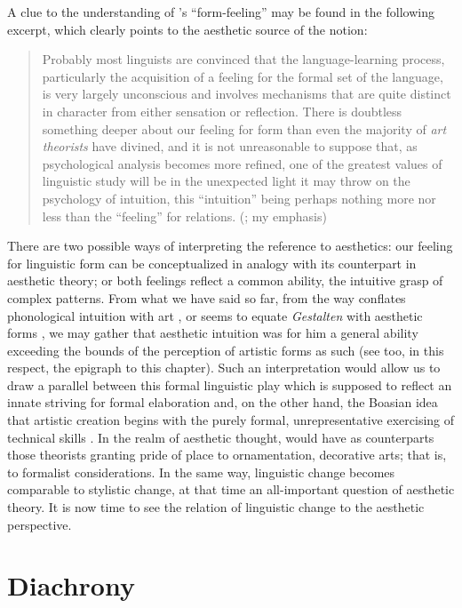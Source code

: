 \documentclass[output=paper]{langscibook}
\begin{document}
A clue to the understanding of {\Sapir}'s ``form-feeling'' may be found in the following excerpt, which clearly points to the aesthetic source of the notion:

\begin{quotation}
Probably most linguists are convinced that the language-learning process, particularly the acquisition of a feeling for the formal set of the language, is very largely unconscious and involves mechanisms that are quite distinct in character from either sensation or reflection. There is doubtless something deeper about our feeling for form than even the majority of \emph{art theorists} have divined, and it is not unreasonable to suppose that, as psychological analysis becomes more refined, one of the greatest values of linguistic study will be in the unexpected light it may throw on the psychology of intuition, this ``intuition'' being perhaps nothing more nor less than the ``feeling'' for relations. (\citealt[156]{Sapir1924}; my emphasis)
\end{quotation}

There are two possible ways of interpreting the reference to aesthetics: our feeling for linguistic form can be conceptualized in analogy with its counterpart in aesthetic theory; or both feelings reflect a common ability, the intuitive grasp of complex patterns. From what we have said so far, from the way {\Sapir} conflates phonological intuition with art \citep[34]{Sapir1925}, or seems to equate \emph{Gestalten} with aesthetic forms \citep[145--150]{Sapir2002}, we may gather that aesthetic intuition was for him a general ability exceeding the bounds of the perception of artistic forms as such (see too, in this respect, the epigraph to this chapter). Such an interpretation would allow us to draw a parallel between this formal linguistic play which is supposed to reflect an innate striving for formal elaboration and, on the other hand, the Boasian idea that artistic creation begins with the purely formal, unrepresentative exercising of technical skills \citep{Boas1927}. In the realm of aesthetic thought, {\Sapir} would have as counterparts those theorists granting pride of place to ornamentation, decorative arts; that is, to formalist considerations. In the same way, linguistic change becomes comparable to stylistic change, at that time an all-important question of aesthetic theory. It is now time to see the relation of linguistic change to the aesthetic perspective.

\section{Diachrony}
\label{sec:fortis:diachrony}
\end{document}
